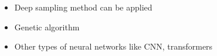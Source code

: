 
\begin{itemize}
    \item Deep sampling method can be applied 
    \item Genetic algorithm 
    \item Other types of neural networks like CNN, transformers 
\end{itemize}